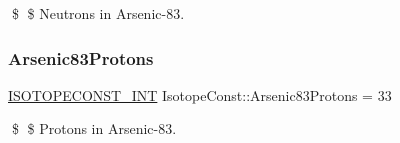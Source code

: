 \$ \$ Neutrons in Arsenic-\/83. \mbox{\label{group___isotope_const-_arsenic-_as83_ga75bd5449dc6d67331aa9f858adca08ad}} 
\subsubsection{\texorpdfstring{Arsenic83\+Protons}{Arsenic83Protons}}
{\footnotesize\ttfamily \mbox{\hyperlink{group___isotope_const-_macros_ga5f18360b3e99483a35c32d789e62621c}{I\+S\+O\+T\+O\+P\+E\+C\+O\+N\+S\+T\+\_\+\+I\+NT}} Isotope\+Const\+::\+Arsenic83\+Protons = 33}

\$ \$ Protons in Arsenic-\/83. 